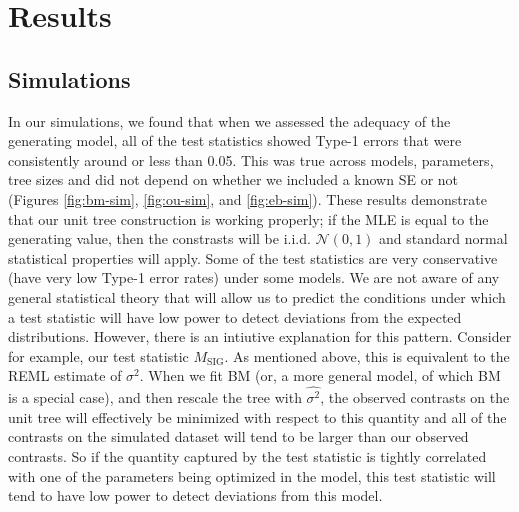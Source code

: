 \section{Results}

\subsection{Simulations}

In our simulations, we found that when we assessed the adequacy of the generating model, all of the test statistics showed Type-1 errors that were consistently around or less than 0.05. This was true across models, parameters, tree sizes and did not depend on whether we included a known SE or not (Figures \ref{fig:bm-sim}, \ref{fig:ou-sim}, and \ref{fig:eb-sim}). These results demonstrate that our unit tree construction is working properly; if the MLE is equal to the generating value, then the constrasts will be i.i.d. $\mathcal{N}(0,1)$ and standard normal statistical properties will apply. Some of the test statistics are very conservative (have very low Type-1 error rates) under some models. We are not aware of any general statistical theory that will allow us to predict the conditions under which a test statistic will have low power to detect deviations from the expected distributions. However, there is an intiutive explanation for this pattern. Consider for example, our test statistic $M_{\text{SIG}}$. As mentioned above, this is equivalent to the REML estimate of $\sigma^2$. When we fit BM (or, a more general model, of which BM is a special case), and then rescale the tree with $\hat{\sigma^2}$, the observed contrasts on the unit tree will effectively be minimized with respect to this quantity and all of the contrasts on the simulated dataset will tend to be larger than our observed contrasts. So if the quantity captured by the test statistic is tightly correlated with one of the parameters being optimized in the model, this test statistic will tend to have low power to detect deviations from this model.

